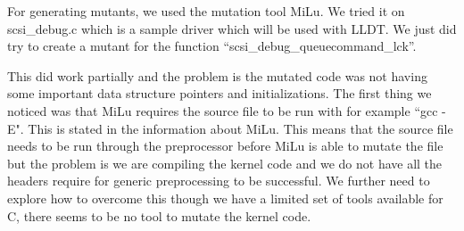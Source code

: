 \begin{sloppypar}For generating mutants, we used the mutation tool MiLu. We tried it on scsi\_debug.c which is a sample driver which will be used with LLDT.  We just did try to create a mutant for the function ``scsi\_debug\_queuecommand\_lck”.\\
\end{sloppypar}

This did work partially and the problem is the mutated code was not having some important data structure pointers and initializations.  The first thing we noticed was that MiLu requires the source file to be run with for example ``gcc -E". This is stated in the information about MiLu. This means that the source file needs to be run through the preprocessor before MiLu is able to mutate the file but the problem is we are compiling the kernel code and we do not have all the headers require for generic preprocessing to be successful.  We further need to explore how to overcome this though we have a limited set of tools available for C, there seems to be no tool to mutate the kernel code.

